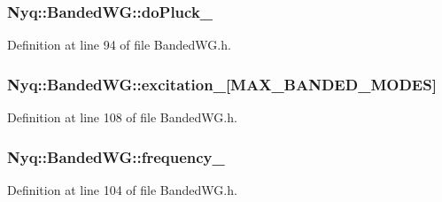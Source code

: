 \subsubsection[{\texorpdfstring{do\+Pluck\+\_\+}{doPluck_}}]{ Nyq\+::\+Banded\+W\+G\+::do\+Pluck\+\_\+\hspace{0.3cm}{\ttfamily [protected]}}\hypertarget{class_nyq_1_1_banded_w_g_ad120ba811356809a4404f9d77213b3f9}{}\label{class_nyq_1_1_banded_w_g_ad120ba811356809a4404f9d77213b3f9}


Definition at line 94 of file Banded\+W\+G.\+h.

\subsubsection[{\texorpdfstring{excitation\+\_\+}{excitation_}}]{ Nyq\+::\+Banded\+W\+G\+::excitation\+\_\+\mbox{[}{\bf M\+A\+X\+\_\+\+B\+A\+N\+D\+E\+D\+\_\+\+M\+O\+D\+ES}\mbox{]}\hspace{0.3cm}{\ttfamily [protected]}}\hypertarget{class_nyq_1_1_banded_w_g_a062e9fb75af9fdc977b3af7b4c2c4281}{}\label{class_nyq_1_1_banded_w_g_a062e9fb75af9fdc977b3af7b4c2c4281}


Definition at line 108 of file Banded\+W\+G.\+h.

\subsubsection[{\texorpdfstring{frequency\+\_\+}{frequency_}}]{ Nyq\+::\+Banded\+W\+G\+::frequency\+\_\+\hspace{0.3cm}{\ttfamily [protected]}}\hypertarget{class_nyq_1_1_banded_w_g_ad4c87edb9869dfd022ec4cd327e5ad98}{}\label{class_nyq_1_1_banded_w_g_ad4c87edb9869dfd022ec4cd327e5ad98}


Definition at line 104 of file Banded\+W\+G.\+h.

